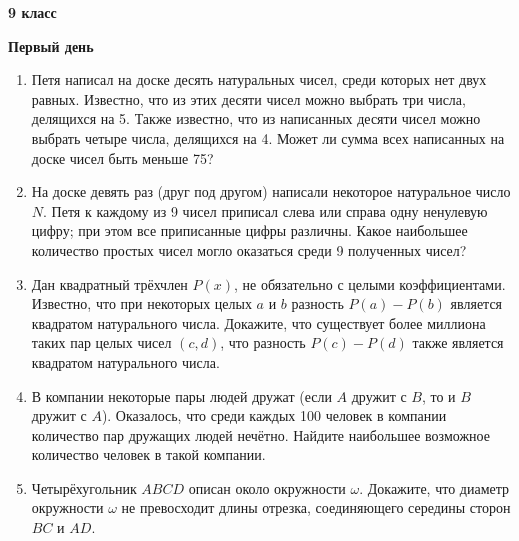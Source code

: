 \documentclass{article}
\begin{document}
    \large

    \begin{center}
        \LARGE\textbf{9 класс}
    \end{center}
    \begin{center}
        \large\textbf{Первый день}
    \end{center}


    \begin{enumerate}[label*=9.{\arabic{enumi}}]
        \setcounter{enumi}{0}

        \item Петя написал на доске десять натуральных чисел, среди которых нет двух равных.
        Известно, что из этих десяти чисел можно выбрать три числа, делящихся на 5.
        Также известно, что из написанных десяти чисел можно выбрать четыре числа, делящихся на 4.
        Может ли сумма всех написанных на доске чисел быть меньше 75?

        \item На доске девять раз (друг под другом) написали некоторое натуральное число $N$.
        Петя к каждому из 9 чисел приписал слева или справа одну ненулевую цифру; при этом все приписанные цифры различны.
        Какое наибольшее количество простых чисел могло оказаться среди 9 полученных чисел?

        \item  Дан квадратный трёхчлен $P(x)$, не обязательно с целыми коэффициентами.
        Известно, что при некоторых целых $a$ и $b$ разность $P(a) - P(b)$ является квадратом натурального числа.
        Докажите, что существует более миллиона таких пар целых чисел $(c, d)$, что разность $P(c) - P(d)$ также является квадратом натурального числа.

        \item  В компании некоторые пары людей дружат (если $A$ дружит с $B$, то и $B$ дружит с $A$). Оказалось, что среди каждых 100 человек в компании количество пар дружащих людей нечётно.
        Найдите наибольшее возможное количество человек в такой компании.

        \item Четырёхугольник $ABCD$ описан около окружности $\omega$.
        Докажите, что диаметр окружности $\omega$ не превосходит длины отрезка, соединяющего середины сторон $BC$ и $AD$.

    \end{enumerate}

    \newpage
\end{document}
